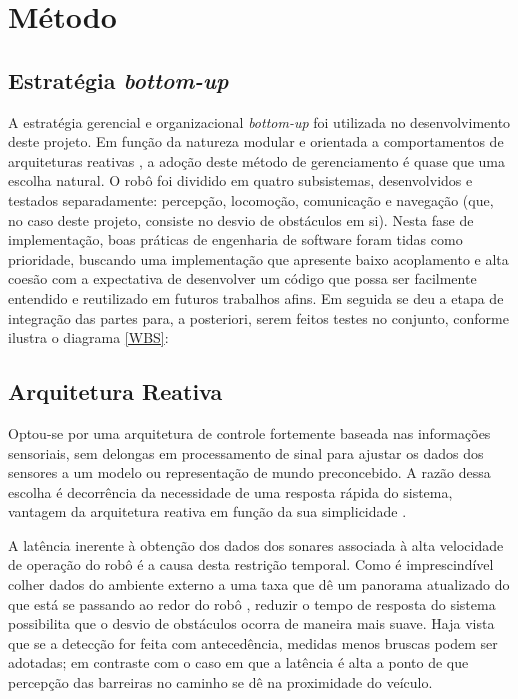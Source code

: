 \chapter{Método}
\section{Estratégia \textit{bottom-up}}
A estratégia gerencial e organizacional \textit{bottom-up} foi utilizada no desenvolvimento deste projeto. 
Em função da natureza modular e orientada a comportamentos de arquiteturas reativas \cite{murphy}, a adoção deste método de gerenciamento é quase que 
uma escolha natural.
O robô foi dividido em quatro subsistemas, desenvolvidos e testados separadamente: percepção, locomoção, comunicação e navegação (que, no caso deste 
projeto, consiste no desvio de obstáculos em si). %
Nesta fase de implementação,  boas práticas de engenharia de software foram tidas como prioridade, buscando uma implementação que 
apresente baixo acoplamento  e alta coesão com a expectativa de desenvolver um código que possa ser facilmente entendido e reutilizado em futuros 
trabalhos afins.
Em seguida se deu a etapa de integração das partes para, a posteriori, serem feitos testes no conjunto, conforme ilustra o diagrama \ref{WBS}:

\section{Arquitetura Reativa} 

Optou-se por uma arquitetura de controle fortemente baseada nas informações sensoriais, sem delongas em processamento de sinal para ajustar os dados 
dos sensores a um modelo ou representação de mundo preconcebido. 
A razão dessa escolha é decorrência da necessidade de uma resposta rápida do sistema, vantagem da arquitetura reativa em função da sua simplicidade 
\cite{roseli}.

A latência inerente à obtenção dos dados dos sonares \cite{jones} associada à alta velocidade de operação do robô é a causa desta restrição 
temporal. %
Como é imprescindível colher dados do ambiente externo a uma taxa que dê um panorama atualizado do que está se passando ao redor do robô 
\cite{brooks}, reduzir o tempo de resposta do sistema possibilita que o desvio de obstáculos ocorra de maneira mais suave.
Haja vista que se a detecção for feita com antecedência, medidas menos bruscas podem ser adotadas; em contraste com o caso em que a latência é alta a 
ponto de que percepção das barreiras no caminho se dê na proximidade do veículo.

